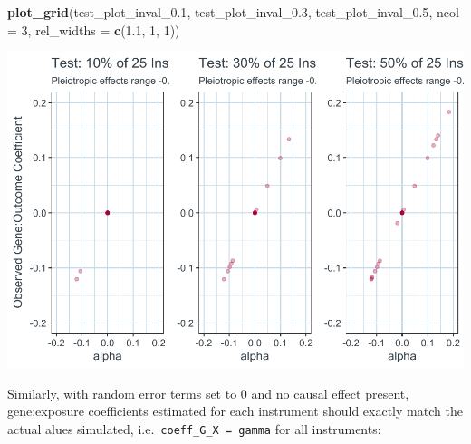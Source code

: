 \documentclass[
]{article}
\newenvironment{Shaded}{\begin{snugshade}}{\end{snugshade}}
\newcommand{\AttributeTok}[1]{\textcolor[rgb]{0.13,0.29,0.53}{#1}}
\newcommand{\DecValTok}[1]{\textcolor[rgb]{0.00,0.00,0.81}{#1}}
\newcommand{\FloatTok}[1]{\textcolor[rgb]{0.00,0.00,0.81}{#1}}
\newcommand{\FunctionTok}[1]{\textcolor[rgb]{0.13,0.29,0.53}{\textbf{#1}}}
\newcommand{\NormalTok}[1]{#1}
\begin{document}
\begin{Shaded}
\begin{Highlighting}[]
 \FunctionTok{plot\_grid}\NormalTok{(test\_plot\_inval\_0}\FloatTok{.1}\NormalTok{,}
\NormalTok{           test\_plot\_inval\_0}\FloatTok{.3}\NormalTok{,}
\NormalTok{           test\_plot\_inval\_0}\FloatTok{.5}\NormalTok{,}
           \AttributeTok{ncol =} \DecValTok{3}\NormalTok{,}
           \AttributeTok{rel\_widths =} \FunctionTok{c}\NormalTok{(}\FloatTok{1.1}\NormalTok{, }\DecValTok{1}\NormalTok{, }\DecValTok{1}\NormalTok{))}
\end{Highlighting}
\end{Shaded}

\includegraphics{9_Test_Appendices_files/figure-latex/test-plot-prop-invalid-1.pdf}

Similarly, with random error terms set to 0 and no causal effect present, gene:exposure coefficients estimated for each instrument should exactly match the actual alues simulated, i.e.~\texttt{coeff\_G\_X\ =\ gamma} for all instruments:
\end{document}
